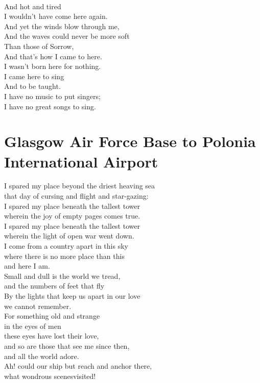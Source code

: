 \documentclass[smalldemyvopaper,11pt,twoside,onecolumn,openright,extrafontsizes]{memoir}
\begin{document}
\\And hot and tired
\\I wouldn't have come here again.
\\And yet the winds blow through me,
\\And the waves could never be more soft
\\Than those of Sorrow,
\\And that's how I came to here.
\\I wasn't born here for nothing.
\\I came here to sing
\\And to be taught.
\\I have no music to put singers;
\\I have no great songs to sing.



\chapter{Glasgow Air Force Base to Polonia International Airport}
I spared my place beyond the driest heaving sea
\\that day of cursing and flight and star-gazing:
\\I spared my place beneath the tallest tower
\\wherein the joy of empty pages comes true.
\\I spared my place beneath the tallest tower
\\wherein the light of open war went down.
\\I come from a country apart in this sky
\\where there is no more place than this
\\and here I am.
\\Small and dull is the world we tread,
\\and the numbers of feet that fly
\\By the lights that keep us apart in our love
\\we cannot remember.
\\For something old and strange
\\in the eyes of men
\\these eyes have lost their love,
\\and so are those that see me since then,
\\and all the world adore.
\\Ah! could our ship but reach and anchor there,
\\what wondrous scenesvisited!
\end{document}
